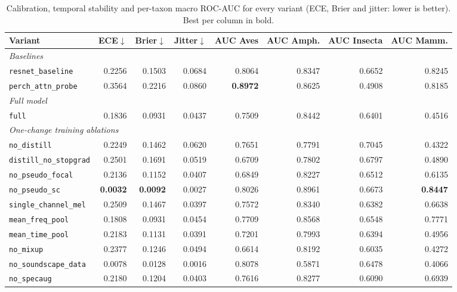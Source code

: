 \begin{table}[H]\centering\small
\caption{Calibration, temporal stability and per-taxon macro ROC-AUC for every variant (ECE, Brier and jitter: lower is better). Best per column in bold.}\label{tab:main_calib}
\setlength{\tabcolsep}{3.5pt}
\begin{adjustbox}{max width=\linewidth}
\begin{tabular}{lrrrrrrr}
\toprule
Variant & ECE$\downarrow$ & Brier$\downarrow$ & Jitter$\downarrow$ & AUC Aves & AUC Amph. & AUC Insecta & AUC Mamm. \\
\midrule
\multicolumn{8}{l}{\emph{Baselines}} \\
\texttt{resnet\_baseline} & 0.2256 & 0.1503 & 0.0684 & 0.8064 & 0.8347 & 0.6652 & 0.8245 \\
\texttt{perch\_attn\_probe} & 0.3564 & 0.2216 & 0.0860 & \textbf{0.8972} & 0.8625 & 0.4908 & 0.8185 \\
\midrule
\multicolumn{8}{l}{\emph{Full model}} \\
\texttt{full} & 0.1836 & 0.0931 & 0.0437 & 0.7509 & 0.8442 & 0.6401 & 0.4516 \\
\midrule
\multicolumn{8}{l}{\emph{One-change training ablations}} \\
\texttt{no\_distill} & 0.2249 & 0.1462 & 0.0620 & 0.7651 & 0.7791 & 0.7045 & 0.4322 \\
\texttt{distill\_no\_stopgrad} & 0.2501 & 0.1691 & 0.0519 & 0.6709 & 0.7802 & 0.6797 & 0.4890 \\
\texttt{no\_pseudo\_focal} & 0.2136 & 0.1152 & 0.0407 & 0.6849 & 0.8227 & 0.6512 & 0.6135 \\
\texttt{no\_pseudo\_sc} & \textbf{0.0032} & \textbf{0.0092} & 0.0027 & 0.8026 & 0.8961 & 0.6673 & \textbf{0.8447} \\
\texttt{single\_channel\_mel} & 0.2509 & 0.1467 & 0.0397 & 0.7572 & 0.8340 & 0.6382 & 0.6638 \\
\texttt{mean\_freq\_pool} & 0.1808 & 0.0931 & 0.0454 & 0.7709 & 0.8568 & 0.6548 & 0.7771 \\
\texttt{mean\_time\_pool} & 0.2183 & 0.1131 & 0.0391 & 0.7201 & 0.7993 & 0.6394 & 0.4956 \\
\texttt{no\_mixup} & 0.2377 & 0.1246 & 0.0494 & 0.6614 & 0.8192 & 0.6035 & 0.4272 \\
\texttt{no\_soundscape\_data} & 0.0078 & 0.0128 & 0.0016 & 0.8078 & 0.5871 & 0.6478 & 0.4066 \\
\texttt{no\_specaug} & 0.2180 & 0.1204 & 0.0403 & 0.7616 & 0.8277 & 0.6090 & 0.6939 \\

\end{tabular}
\end{adjustbox}
\end{table}

